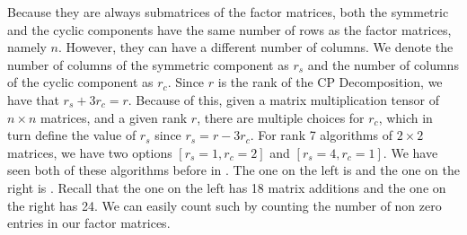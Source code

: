     Because they are always submatrices of the factor matrices, both the
    symmetric and the cyclic components have the same number of rows as the
    factor matrices, namely $n$. However, they can have a different number of
    columns. We denote the number of columns of the symmetric component as $r_s$
    and the number of columns of the cyclic component as $r_c$. Since $r$ is the
    rank of the CP Decomposition, we have that $r_s + 3r_c = r$. Because of
    this, given a matrix multiplication tensor of $n\times n$ matrices, and a
    given rank $r$, there are multiple choices for $r_c$, which in turn define
    the value of $r_s$ since $r_s = r - 3r_c$. For rank 7 algorithms of $2\times
    2$ matrices, we have two options $[r_s = 1, r_c = 2]$ and  $[r_s = 4, r_c =
    1]$. We have seen both of these algorithms before in . The one on the left is 
    and the one on the right is . Recall that the one on
    the left has 18 matrix additions and the one on the right has 24. We can
    easily count such by counting the number of non zero entries in our factor
    matrices. 


